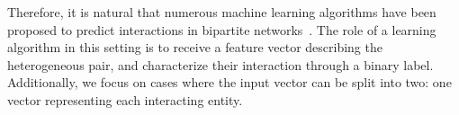 
Therefore, it is natural that numerous machine learning algorithms have been proposed to predict interactions in bipartite networks~\cite{chen2018machine,bagherian2020machine}. 
The role of a learning algorithm in this setting is to receive a feature vector describing the heterogeneous pair, and characterize their interaction through a binary label.
Additionally, we focus on cases where the input vector can be split into two: one vector representing each interacting entity.
%


